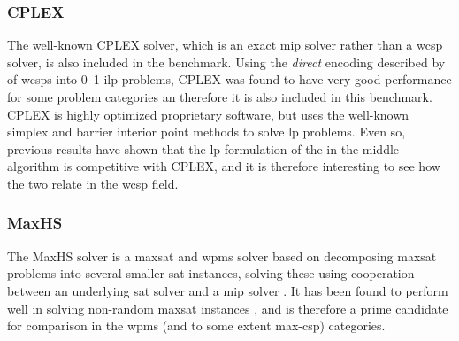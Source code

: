 \subsubsection{CPLEX}
The well-known CPLEX solver, which is an exact \gls{mip} solver rather than a \gls{wcsp} solver, is also included in the benchmark.
Using the \emph{direct} encoding described by \textcite[\pno~3]{deGivry14} of \glspl{wcsp} into 0--1 \gls{ilp} problems, CPLEX was found to have very good performance for some problem categories an therefore it is also included in this benchmark.
CPLEX is highly optimized proprietary software, but uses the well-known simplex and barrier interior point methods to solve \gls{lp} problems.
Even so, previous results \parencite{Mason01,Ernst05} have shown that the \gls{lp} formulation of the in-the-middle algorithm is competitive with CPLEX, and it is therefore interesting to see how the two relate in the \gls{wcsp} field.

\subsubsection{MaxHS}
The MaxHS solver is a \gls{maxsat} and \gls{wpms} solver based on decomposing \gls{maxsat} problems into several smaller \gls{sat} instances, solving these using cooperation between an underlying \gls{sat} solver and a \gls{mip} solver \parencite{Davies11}.
It has been found to perform well in solving non-random \gls{maxsat} instances \parencite{Davies13}, and is therefore a prime candidate for comparison in the \gls{wpms} (and to some extent max-\gls{csp}) categories.
